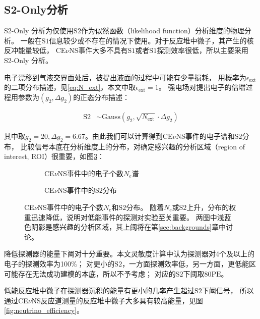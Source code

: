 \subsection{S2-Only分析}

S2-Only 分析为仅使用$\mathrm{S2}$作为似然函数（likelihood function）分析维度的物理分析。
一般在$\mathrm{S1}$信息较少或不存在的情况下使用。对于反应堆中微子，其产生的核反冲能量较低，
CE$\nu$NS事件大多不具有$\mathrm{S1}$或者$\mathrm{S1}$探测效率很低，所以主要采用S2-Only 分析。

电子漂移到气液交界面处后，被提出液面的过程中可能有少量损耗，
用概率为$\epsilon_\mathrm{ext}$的二项分布描述，见\ref{eq:N_ext}，本文中取$\epsilon_\mathrm{ext}=1$。
强电场对提出电子的倍增过程用参数为$(g_2,\Delta g_2)$的正态分布描述：

\begin{align}
    \label{eq:s2}
    \mathrm{S2} &\sim \mathrm{Gauss}\left(g_2,\sqrt{N_\mathrm{ext}}\cdot\Delta g_2\right)
\end{align}

其中取$g_2=20,\Delta g_2=6.67$。由此我们可以计算得到CE$\nu$NS事件的电子谱和$\mathrm{S2}$分布，
比较信号本底在分析维度上的分布，对确定感兴趣的分析区域（region of interest, ROI）很重要，如图\ref{fig:S2eS2_rate}：

\begin{figure}
  \begin{subfigure}{.5\textwidth}
    \centering
    
    \caption{\label{fig:S2e_rate} CE$\nu$NS事件中的电子个数$N_e$谱}
  \end{subfigure}
  \begin{subfigure}{.5\textwidth}
    \centering
    
    \caption{\label{fig:S2_rate} CE$\nu$NS事件中的$\mathrm{S2}$分布}
  \end{subfigure}
  \caption{\label{fig:S2eS2_rate} CE$\nu$NS事件中的电子个数$N_e$和$\mathrm{S2}$分布。
  随着$N_e$或$\mathrm{S2}$上升，分布的权重迅速降低，说明对低能事件的探测对实验至关重要。
  两图中浅蓝色阴影是感兴趣的分析区域，其上阈将在第\ref{sec:backgrounds}章中讨论。}
\end{figure}

降低探测器的能量下阈对十分重要。本文灵敏度计算中认为探测器对4个及以上的电子的探测效率为100\%；
对更小的$\mathrm{S2}$，一方面探测效率低，另一方面，更低能区可能存在无法成功建模的本底，所以不予考虑；
对应的$\mathrm{S2}$下阈取$80\mathrm{PE}$。

低能反应堆中微子在探测器沉积的能量有更小的几率产生超过$\mathrm{S2}$下阈信号，
所以通过CE$\nu$NS反应道测量的反应堆中微子大多具有较高能量，见图\ref{fig:neutrino_efficiency}。

